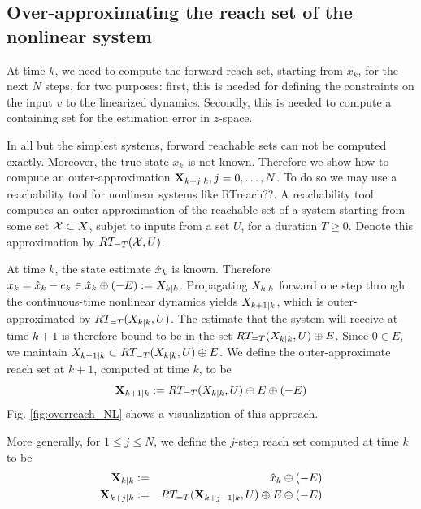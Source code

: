  \subsection{Over-approximating the reach set of the nonlinear system}
\label{sec:x reach}

At time $k$, we need to compute the forward reach set, starting from $x_k$, for the next $N$ steps, for two purposes:
first, this is needed for defining the constraints on the input $v$ to the linearized dynamics.
Secondly, this is needed to compute a containing set for the estimation error in $z$-space.

In all but the simplest systems, forward reachable sets can not be computed exactly.
Moreover, the true state $x_k$ is not known.
Therefore we show how to compute an outer-approximation $\mathbf{X}_{k+j|k},  j=0,\ldots, N$.
To do so we may use a reachability tool for nonlinear systems like RTreach??. 
A reachability tool computes an outer-approximation of the reachable set of a system starting from some set $\mathcal{X} \subset X$, subjet to inputs from a set $U$, for a duration $T \geq 0$. 
Denote this approximation by $RT_{=T}(\mathcal{X},U)$.

At time $k$, the state estimate $\hat{x}_{k}$ is known.
Therefore $x_k = \hat{x}_{k} - e_k \in \hat{x}_{k} \oplus (-E) := X_{k|k}$.
Propagating $X_{k|k}$ forward one step through the continuous-time nonlinear dynamics yields $X_{k+1|k}$, which is outer-approximated by $RT_{=T}(X_{k|k},U)$.
The estimate that the system will receive at time $k+1$ is therefore bound to be in the set $RT_{=T}(X_{k|k},U)  \oplus E$.
Since $0 \in E$, we maintain $X_{k+1|k} \subset RT_{=T}(X_{k|k},U)  \oplus E$.
We define the outer-approximate reach set at $k+1$, computed at time $k$, to be 
\begin{equation*}
\label{eq:def Xk}
\mathbf{X}_{k+1|k} :=  RT_{=T}(X_{k|k},U)  \oplus E \oplus  (-E)
\end{equation*}
Fig. \ref{fig:overreach_NL} shows a visualization of this approach.

More generally, for $1 \leq j \leq N$, we define the $j$-step reach set computed at time $k$ to be
\begin{eqnarray}
\label{eq:def Xkj}
\mathbf{X}_{k|k} &:=&   \hat{x}_{k} \oplus (-E) 
\nonumber
\\
\mathbf{X}_{k+j|k} & :=& RT_{=T}(\mathbf{X}_{k+j-1|k},U) \oplus E \oplus (-E) 
\end{eqnarray}

